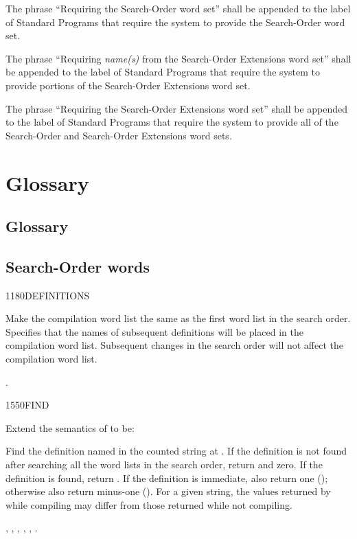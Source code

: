 The phrase ``Requiring the Search-Order word set'' shall be appended
to the label of Standard Programs that require the system to provide
the Search-Order word set.

The phrase ``Requiring \emph{name(s)} from the Search-Order
Extensions word set'' shall be appended to the label of Standard
Programs that require the system to provide portions of the
Search-Order Extensions word set.

The phrase ``Requiring the Search-Order Extensions word set'' shall
be appended to the label of Standard Programs that require the system
to provide all of the Search-Order and Search-Order Extensions word
sets.


\section{Glossary} %

\begin{intro}
\subsection{Glossary} %
\end{intro}

\subsection{Search-Order words} %

\begin{worddef}{1180}{DEFINITIONS}
\item \stack{}{}

	Make the compilation word list the same as the first word list
	in the search order. Specifies that the names of subsequent
	definitions will be placed in the compilation word list.
	Subsequent changes in the search order will not affect the
	compilation word list.

\see {}.
\end{worddef}


\begin{worddef}{1550}{FIND}
\item Extend the semantics of  to be:


	Find the definition named in the counted string at .
	If the definition is not found after searching all the word lists
	in the search order, return  and zero. If
	the definition is found, return . If the definition is
	immediate, also return one (); otherwise also return
	minus-one (). For a given string, the values returned
	by  while compiling may differ from those returned
	while not compiling.

\see {},
	,
	,
	,
	,
	.
\end{worddef}


